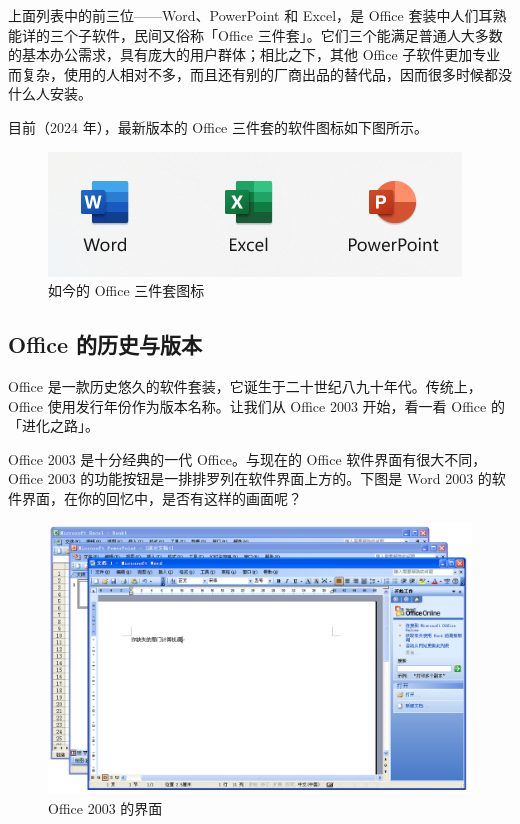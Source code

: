 上面列表中的前三位——Word、PowerPoint 和 Excel，是 Office 套装中人们耳熟能详的三个子软件，民间又俗称「Office 三件套」。它们三个能满足普通人大多数的基本办公需求，具有庞大的用户群体；相比之下，其他 Office 子软件更加专业而复杂，使用的人相对不多，而且还有别的厂商出品的替代品，因而很多时候都没什么人安装。

目前（2024 年），最新版本的 Office 三件套的软件图标如下图所示。

\begin{figure}[htb!]
  \centering
  \includegraphics[width=.5\textwidth]{assets/software/Office_icons.png}
  \caption{如今的 Office 三件套图标}
  \label{fig:Office_icons}
\end{figure}
\vspace*{-1cm}

\subsection{Office 的历史与版本}

Office 是一款历史悠久的软件套装，它诞生于二十世纪八九十年代。传统上，Office 使用发行年份作为版本名称。让我们从 Office 2003 开始，看一看 Office 的「进化之路」。

Office 2003 是十分经典的一代 Office。与现在的 Office 软件界面有很大不同，Office 2003 的功能按钮是一排排罗列在软件界面上方的。下图是 Word 2003 的软件界面，在你的回忆中，是否有这样的画面呢？

\begin{figure}[htb!]
  \centering
  \includegraphics[width=.83\textwidth]{assets/software/Office_2003.png}
  \caption{Office 2003 的界面}
  \label{fig:Office_2003}
\end{figure}


